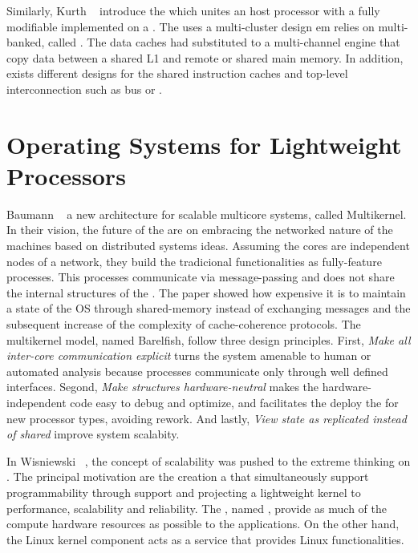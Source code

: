 	Similarly, Kurth \etal~\cite{Kurth2017} introduce the \hero which unites an \arm
	host processor with a fully modifiable \riscv \manycore implemented on a \fpga.
	The \pmca uses a multi-cluster design em relies on multi-banked, called \spms.
	The data caches had substituted to a multi-channel \dma engine that copy data
	between a shared L1 \spm and remote \smps or shared main memory.
	In addition, exists different designs for the shared instruction caches and
	top-level interconnection such as bus or \noc.

\section{Operating Systems for Lightweight \manycore Processors}

	Baumann \etal~\cite{Baumann2009} a new \os architecture for scalable multicore
	systems, called Multikernel.
	In their vision, the future of the \oses are on embracing the networked nature
	of the machines based on distributed systems ideas.
	Assuming the cores are independent nodes of a network, they build the tradicional
	\os functionalities as fully-feature processes.
	This processes communicate via message-passing and does not share the internal
	structures of the \os.
	The paper showed how expensive it is to maintain a state of the OS through
	shared-memory instead of exchanging messages and the subsequent increase of
	the complexity of cache-coherence protocols.
	The multikernel model, named Barelfish, follow three design principles.
	First, \textit{Make all inter-core communication explicit} turns the system
	amenable to human or automated analysis because processes communicate only
	through well defined interfaces.
	Segond, \textit{Make \os structures hardware-neutral} makes the hardware-independent
	code easy to debug and optimize, and facilitates the deploy the \os for new
	processor types, avoiding rework.
	And lastly, \textit{View \os state as replicated instead of shared} improve system
	scalabity.

	In Wisniewski~\cite{Wisniewski2014} \etal, the concept of scalability was pushed
	to the extreme thinking on \hpc.
	The principal motivation are the creation a \os that simultaneously support
	programmability through support \linux \api and projecting a lightweight kernel
	to performance, scalability and reliability.
	The \os, named \mos, provide as much of the compute hardware resources as
	possible to the \hpc applications. On the other hand, the Linux kernel
	component acts as a service that provides Linux functionalities.
	
